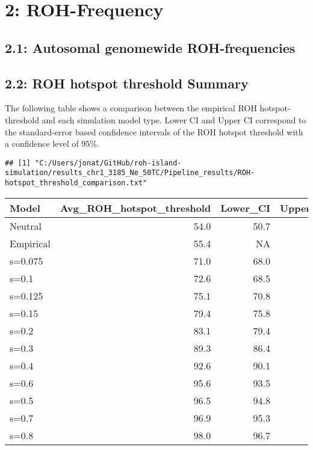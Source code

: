 \documentclass[
]{article}
\begin{document}
\section{2: ROH-Frequency}\label{roh-frequency-1}

\subsection{2.1: Autosomal genomewide
ROH-frequencies}\label{autosomal-genomewide-roh-frequencies}

\subsection{2.2: ROH hotspot threshold
Summary}\label{roh-hotspot-threshold-summary}

The following table shows a comparison between the empirical ROH
hotspot-threshold and each simulation model type. Lower CI and Upper CI
correspond to the standard-error based confidence intervals of the ROH
hotspot threshold with a confidence level of 95\%.

\begin{verbatim}
## [1] "C:/Users/jonat/GitHub/roh-island-simulation/results_chr1_3185_Ne_50TC/Pipeline_results/ROH-hotspot_threshold_comparison.txt"
\end{verbatim}

\begin{longtable}[]{@{}lrrr@{}}
\toprule\noalign{}
Model & Avg\_ROH\_hotspot\_threshold & Lower\_CI & Upper\_CI \\
\midrule\noalign{}
\endhead
\bottomrule\noalign{}
\endlastfoot
Neutral & 54.0 & 50.7 & 57.4 \\
Empirical & 55.4 & NA & NA \\
s=0.075 & 71.0 & 68.0 & 74.1 \\
s=0.1 & 72.6 & 68.5 & 76.7 \\
s=0.125 & 75.1 & 70.8 & 79.3 \\
s=0.15 & 79.4 & 75.8 & 83.0 \\
s=0.2 & 83.1 & 79.4 & 86.8 \\
s=0.3 & 89.3 & 86.4 & 92.2 \\
s=0.4 & 92.6 & 90.1 & 95.1 \\
s=0.6 & 95.6 & 93.5 & 97.7 \\
s=0.5 & 96.5 & 94.8 & 98.2 \\
s=0.7 & 96.9 & 95.3 & 98.5 \\
s=0.8 & 98.0 & 96.7 & 99.3 \\
\end{longtable}
\end{document}
